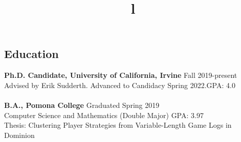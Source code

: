 \documentclass[margin]{res}
\begin{document}
\begin{resume}

\section{Education}
\textbf{Ph.D. Candidate, University of California, Irvine} \hfill Fall 2019-present\\
Advised by Erik Sudderth. Advanced to Candidacy Spring 2022.\hfill GPA: 4.0\\ \\
\textbf{B.A., Pomona College} \hfill Graduated Spring 2019\\
Computer Science and Mathematics (Double Major) \hfill GPA: 3.97\\
Thesis: Clustering Player Strategies from Variable-Length Game Logs in Dominion

\begin{format}
\title{l}\\
\\
\body\\
\end{format}

%


\end{resume}
\end{document}
